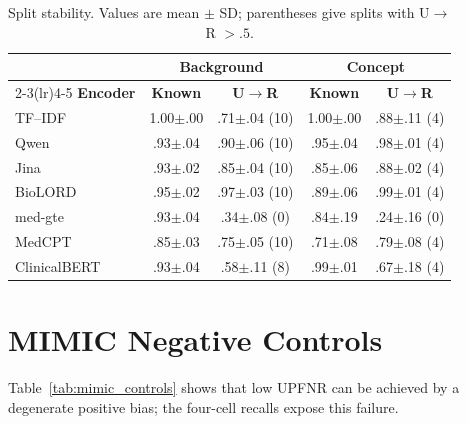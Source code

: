 \documentclass[11pt]{article}
\begin{document}
\begin{table}[!htbp]
  \centering
  \scriptsize
  \renewcommand{\arraystretch}{1.06}
  \caption{Split stability. Values are mean $\pm$ SD; parentheses give
  splits with U$\to$R $>.5$.}
  \label{tab:split_stability}
  \begin{tabular*}{\columnwidth}{@{\extracolsep{\fill}}lcccc@{}}
    \toprule
    & \multicolumn{2}{c}{\textbf{Background}} &
    \multicolumn{2}{c}{\textbf{Concept}} \\
    \cmidrule(lr){2-3}\cmidrule(lr){4-5}
    \textbf{Encoder} & \textbf{Known} & \textbf{U$\to$R} &
    \textbf{Known} & \textbf{U$\to$R} \\
    \midrule
    TF--IDF & 1.00$\pm$.00 & .71$\pm$.04 (10) &
              1.00$\pm$.00 & .88$\pm$.11 (4) \\
    Qwen    & .93$\pm$.04 & .90$\pm$.06 (10) &
              .95$\pm$.04 & .98$\pm$.01 (4) \\
    Jina    & .93$\pm$.02 & .85$\pm$.04 (10) &
              .85$\pm$.06 & .88$\pm$.02 (4) \\
    BioLORD & .95$\pm$.02 & .97$\pm$.03 (10) &
              .89$\pm$.06 & .99$\pm$.01 (4) \\
    med-gte & .93$\pm$.04 & .34$\pm$.08 (0) &
              .84$\pm$.19 & .24$\pm$.16 (0) \\
    MedCPT  & .85$\pm$.03 & .75$\pm$.05 (10) &
              .71$\pm$.08 & .79$\pm$.08 (4) \\
    ClinicalBERT & .93$\pm$.04 & .58$\pm$.11 (8) &
              .99$\pm$.01 & .67$\pm$.18 (4) \\
    \bottomrule
  \end{tabular*}
\end{table}

\FloatBarrier

\section{MIMIC Negative Controls}
\label{app:mimic_controls}
Table~\ref{tab:mimic_controls} shows that low UPFNR can be achieved by a
degenerate positive bias; the four-cell recalls expose this failure.
\end{document}
